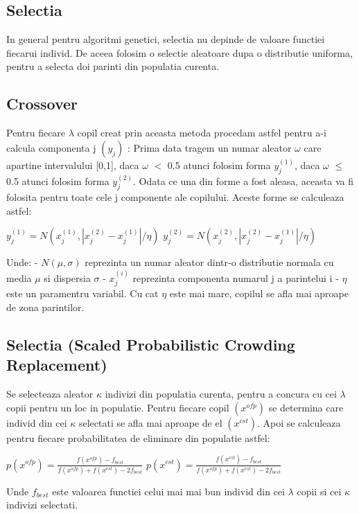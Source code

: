 \documentclass[a4paper]{article}
\begin{document}
\subsection{Selectia}
In general pentru algoritmi genetici, selectia nu depinde de valoare functiei fiecarui individ. De aceea folosim o selectie aleatoare dupa o distributie uniforma, pentru a selecta doi parinti  din populatia curenta.

\subsection{Crossover}
Pentru fiecare  $\lambda$ copil creat prin aceasta metoda procedam astfel pentru a-i calcula componenta j $(y_{j})$ : Prima data tragem un numar aleator $\omega$ care apartine intervalului [0,1], daca $\omega$ $<$ 0.5  atunci folosim forma $y_{j}^{(1)}$, daca $\omega$ $\leq$ 0.5 atunci folosim forma $y_{j}^{(2)}$. Odata ce una din forme a fost aleasa, aceasta va fi folosita pentru toate cele j componente ale copilului. Aceste forme se calculeaza astfel:  \vspace{5mm}

\centerline{$y_{j}^{(1)} = N(x_{j}^{(1)}, |x_{j}^{(2)} - x_{j}^{(1)}|/\eta)$ \hspace{1cm} $y_{j}^{(2)} = N(x_{j}^{(2)}, |x_{j}^{(2)} - x_{j}^{(1)}|/\eta)$ } \vspace{5mm}

Unde:
\newline
- $N(\mu,\sigma)$ reprezinta un numar aleator dintr-o distributie normala cu media $\mu$ si dispersia $\sigma$
\newline
- $x_{j}^{(i)}$ reprezinta componenta numarul j a parintelui i
\newline
- $\eta$ este un paramentru variabil. Cu cat $\eta$ este mai mare, copilul se afla mai aproape de zona parintilor.
\newpage

\subsection{Selectia (Scaled Probabilistic Crowding Replacement)}
Se selecteaza aleator $\kappa$ indivizi din populatia curenta, pentru a concura cu cei $\lambda$ copii pentru un loc in populatie.
\newline
Pentru fiecare copil $(x^{ofp})$ se determina care individ din cei $\kappa$ selectati se afla mai aproape de el  $(x^{cst})$. Apoi se calculeaza pentru fiecare probabilitatea de eliminare din populatie astfel: \vspace{5mm}

\centerline{ $p(x^{ofp}) = \frac{f(x^{ofp}) - f_{best}}{f(x^{ofp}) + f(x^{cst}) - 2f_{best}}$ \hspace{1cm} $p(x^{cst}) = \frac{f(x^{cst}) - f_{best}}{f(x^{ofp}) + f(x^{cst}) - 2f_{best}}$ } \vspace{5mm}

Unde $f_{best}$ este valoarea functiei celui mai mai bun individ din cei $\lambda$ copii si cei $\kappa$ indivizi selectati.
\end{document}
